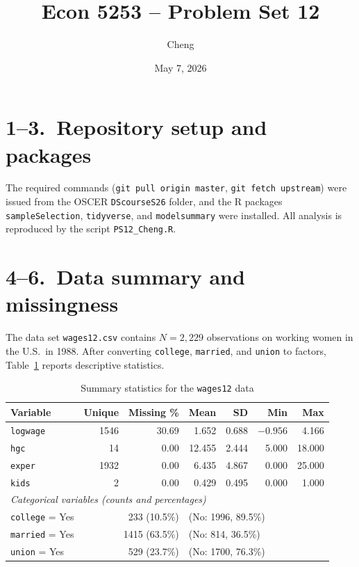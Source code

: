 \documentclass[11pt]{article}
\title{Econ 5253 -- Problem Set 12}
\author{Cheng}
\date{May 7, 2026}
\begin{document}
\maketitle

\section*{1--3.\ Repository setup and packages}
The required commands (\texttt{git pull origin master}, \texttt{git fetch upstream})
were issued from the OSCER \texttt{DScourseS26} folder, and the R packages
\texttt{sampleSelection}, \texttt{tidyverse}, and \texttt{modelsummary} were
installed.  All analysis is reproduced by the script
\texttt{PS12\_Cheng.R}.

\section*{4--6.\ Data summary and missingness}
The data set \texttt{wages12.csv} contains $N = 2{,}229$ observations on
working women in the U.S.\ in 1988.  After converting \texttt{college},
\texttt{married}, and \texttt{union} to factors, Table~\ref{tab:summary}
reports descriptive statistics.

\begin{table}[h]
    \centering
    \caption{Summary statistics for the \texttt{wages12} data}
    \label{tab:summary}
    \begin{tabular}{lrrrrrr}
        \toprule
        Variable     & Unique & Missing \% & Mean   & SD    & Min    & Max    \\
        \midrule
        \texttt{logwage} & 1546 & 30.69 &  1.652 & 0.688 & $-0.956$ &  4.166 \\
        \texttt{hgc}     &   14 &  0.00 & 12.455 & 2.444 &  5.000 & 18.000 \\
        \texttt{exper}   & 1932 &  0.00 &  6.435 & 4.867 &  0.000 & 25.000 \\
        \texttt{kids}    &    2 &  0.00 &  0.429 & 0.495 &  0.000 &  1.000 \\
        \midrule
        \multicolumn{7}{l}{\emph{Categorical variables (counts and percentages)}} \\
        \texttt{college} = Yes & \multicolumn{2}{r}{233 (10.5\%)} & \multicolumn{4}{l}{(No: 1996, 89.5\%)}  \\
        \texttt{married} = Yes & \multicolumn{2}{r}{1415 (63.5\%)} & \multicolumn{4}{l}{(No: 814, 36.5\%)}  \\
        \texttt{union}   = Yes & \multicolumn{2}{r}{529 (23.7\%)} & \multicolumn{4}{l}{(No: 1700, 76.3\%)} \\
        \bottomrule
    \end{tabular}
\end{table}
\end{document}
